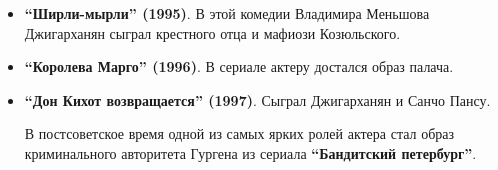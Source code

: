 \begin{itemize}
	 \item \textbf{\enquote{Ширли-мырли} (1995)}. В этой комедии Владимира Меньшова Джигарханян сыграл
   крестного отца и мафиози Козюльского.

	 \item \textbf{\enquote{Королева Марго} (1996)}. В сериале актеру достался образ палача.

	 \item \textbf{\enquote{Дон Кихот возвращается} (1997)}. Сыграл Джигарханян и Санчо Пансу.

   В постсоветское время одной из самых ярких ролей актера стал образ
криминального авторитета Гургена из сериала \textbf{\enquote{Бандитский петербург}}. 

\end{itemize}

